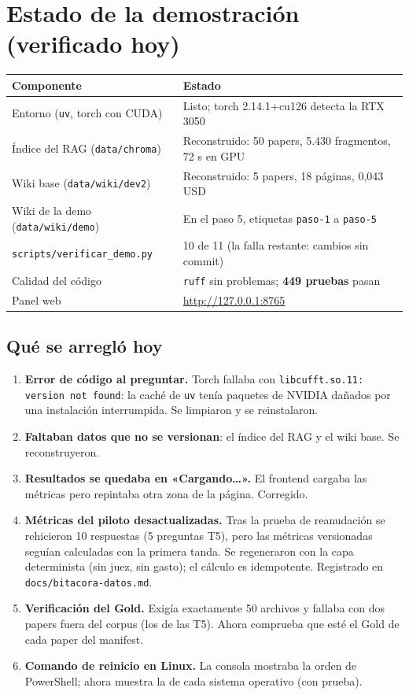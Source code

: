 \documentclass[11pt,a4paper]{article}
\newcommand{\cod}[1]{\texttt{\small #1}}
\begin{document}
\section{Estado de la demostración (verificado hoy)}

\begin{center}
\begin{tabularx}{\linewidth}{@{}l X@{}}
\toprule
\textbf{Componente} & \textbf{Estado} \\
\midrule
Entorno (\cod{uv}, torch con CUDA) & Listo; torch 2.14.1+cu126 detecta la RTX 3050 \\
Índice del RAG (\cod{data/chroma}) & Reconstruido: 50 papers, 5.430 fragmentos, 72 s en GPU \\
Wiki base (\cod{data/wiki/dev2}) & Reconstruido: 5 papers, 18 páginas, 0,043 USD \\
Wiki de la demo (\cod{data/wiki/demo}) & En el paso 5, etiquetas \cod{paso-1} a \cod{paso-5} \\
\cod{scripts/verificar\_demo.py} & 10 de 11 (la falla restante: cambios sin commit) \\
Calidad del código & \cod{ruff} sin problemas; \textbf{449 pruebas} pasan \\
Panel web & \url{http://127.0.0.1:8765} \\
\bottomrule
\end{tabularx}
\end{center}

\subsection{Qué se arregló hoy}
\begin{enumerate}
  \item \textbf{Error de código al preguntar.} Torch fallaba con
        \cod{libcufft.so.11: version not found}: la caché de \cod{uv} tenía paquetes de NVIDIA
        dañados por una instalación interrumpida. Se limpiaron y se reinstalaron.
  \item \textbf{Faltaban datos que no se versionan}: el índice del RAG y el wiki base. Se
        reconstruyeron.
  \item \textbf{Resultados se quedaba en «Cargando…».} El frontend cargaba las métricas pero
        repintaba otra zona de la página. Corregido.
  \item \textbf{Métricas del piloto desactualizadas.} Tras la prueba de reanudación se rehicieron
        10 respuestas (5 preguntas T5), pero las métricas versionadas seguían calculadas con la
        primera tanda. Se regeneraron con la capa determinista (sin juez, sin gasto); el cálculo es
        idempotente. Registrado en \cod{docs/bitacora-datos.md}.
  \item \textbf{Verificación del Gold.} Exigía exactamente 50 archivos y fallaba con dos papers
        fuera del corpus (los de las T5). Ahora comprueba que esté el Gold de cada paper del
        manifest.
  \item \textbf{Comando de reinicio en Linux.} La consola mostraba la orden de PowerShell; ahora
        muestra la de cada sistema operativo (con prueba).
\end{enumerate}
\end{document}
